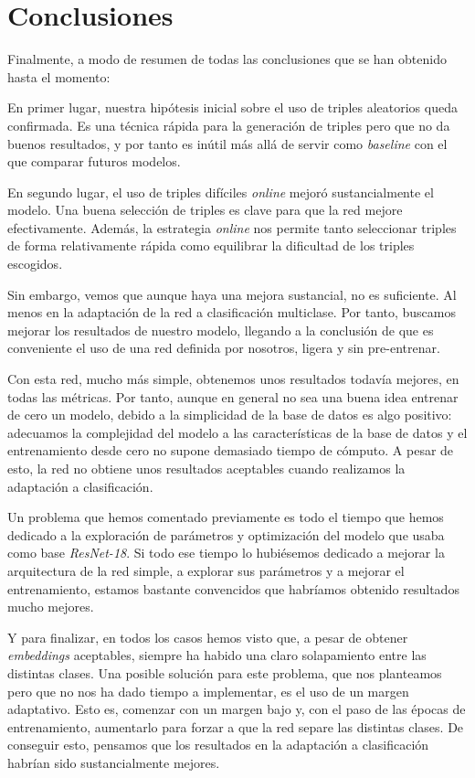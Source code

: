 \documentclass[11pt]{article}
\begin{document}
\pagebreak

\section{Conclusiones} \label{conclusiones_finales:seccion}

Finalmente, a modo de resumen de todas las conclusiones que se han obtenido hasta el momento:

En primer lugar, nuestra hipótesis inicial sobre el uso de triples aleatorios queda confirmada. Es una técnica rápida para la generación de triples pero que no da buenos resultados, y por tanto es inútil más allá de servir como \emph{baseline} con el que comparar futuros modelos.

En segundo lugar, el uso de triples difíciles \emph{online} mejoró sustancialmente el modelo. Una buena selección de triples es clave para que la red mejore efectivamente. Además, la estrategia \emph{online} nos permite tanto seleccionar triples de forma relativamente rápida como equilibrar la dificultad de los triples escogidos.

Sin embargo, vemos que aunque haya una mejora sustancial, no es suficiente. Al menos en la adaptación de la red a clasificación multiclase. Por tanto, buscamos mejorar los resultados de nuestro modelo, llegando a la conclusión de que es conveniente el uso de una red definida por nosotros, ligera y sin pre-entrenar.

Con esta red, mucho más simple, obtenemos unos resultados todavía mejores, en todas las métricas. Por tanto, aunque en general no sea una buena idea entrenar de cero un modelo, debido a la simplicidad de la base de datos es algo positivo: adecuamos la complejidad del modelo a las características de la base de datos y el entrenamiento desde cero no supone demasiado tiempo de cómputo. A pesar de esto, la red no obtiene unos resultados aceptables cuando realizamos la adaptación a clasificación.

Un problema que hemos comentado previamente es todo el tiempo que hemos dedicado a la exploración de parámetros y optimización del modelo que usaba como base \emph{ResNet-18}. Si todo ese tiempo lo hubiésemos dedicado a mejorar la arquitectura de la red simple, a explorar sus parámetros y a mejorar el entrenamiento, estamos bastante convencidos que habríamos obtenido resultados mucho mejores.

Y para finalizar, en todos los casos hemos visto que, a pesar de obtener \emph{embeddings} aceptables, siempre ha habido una claro solapamiento entre las distintas clases. Una posible solución para este problema, que nos planteamos pero que no nos ha dado tiempo a implementar, es el uso de un margen adaptativo. Esto es, comenzar con un margen bajo y, con el paso de las épocas de entrenamiento, aumentarlo para forzar a que la red separe las distintas clases. De conseguir esto, pensamos que los resultados en la adaptación a clasificación habrían sido sustancialmente mejores.

\pagebreak



\end{document}

